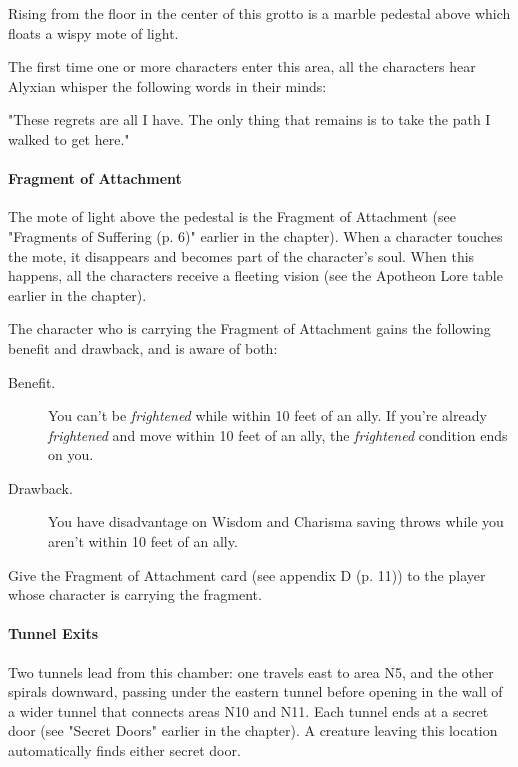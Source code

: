 \documentclass[letterpaper, 11pt, bg=full, twocolumn]{dndbook}
\begin{document}
\begin{DndReadAloud}
Rising from the floor in the center of this grotto is a marble pedestal above which floats a wispy mote of light.
\end{DndReadAloud}

The first time one or more characters enter this area, all the characters hear Alyxian whisper the following words in their minds:

\begin{DndReadAloud}
"These regrets are all I have. The only thing that remains is to take the path I walked to get here."
\end{DndReadAloud}

\paragraph{Fragment of Attachment}

The mote of light above the pedestal is the Fragment of Attachment (see "Fragments of Suffering (p. 6)" earlier in the chapter). When a character touches the mote, it disappears and becomes part of the character's soul. When this happens, all the characters receive a fleeting vision (see the Apotheon Lore table earlier in the chapter).

The character who is carrying the Fragment of Attachment gains the following benefit and drawback, and is aware of both:

\begin{DndSidebar}{}
\begin{description}
\item[Benefit.] You can't be \textit{frightened} while within 10 feet of an ally. If you're already \textit{frightened} and move within 10 feet of an ally, the \textit{frightened} condition ends on you.
\item[Drawback.] You have disadvantage on Wisdom and Charisma saving throws while you aren't within 10 feet of an ally.
\end{description}
\end{DndSidebar}

Give the Fragment of Attachment card (see appendix D (p. 11)) to the player whose character is carrying the fragment.

\paragraph{Tunnel Exits}

Two tunnels lead from this chamber: one travels east to area N5, and the other spirals downward, passing under the eastern tunnel before opening in the wall of a wider tunnel that connects areas N10 and N11. Each tunnel ends at a secret door (see "Secret Doors" earlier in the chapter). A creature leaving this location automatically finds either secret door.
\end{document}
